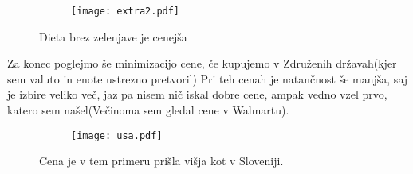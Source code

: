 \documentclass{article}
\begin{document}
\begin{figure}[H]
\centering
\begin{subfigure}{.5\textwidth}
\texttt{[image: extra2.pdf]}
\end{subfigure}
\caption*{Dieta brez zelenjave je cenejša}
\end{figure}
\newpage
Za konec poglejmo še minimizacijo cene, če kupujemo v Združenih državah(kjer sem valuto in enote ustrezno pretvoril) Pri teh cenah je natančnost še manjša, saj je izbire veliko več, jaz pa nisem nič iskal dobre cene, ampak vedno vzel prvo, katero sem našel(Večinoma sem gledal cene v Walmartu).
\begin{figure}[H]
\centering
\begin{subfigure}{.5\textwidth}
\texttt{[image: usa.pdf]}
\end{subfigure}
\caption*{Cena je v tem primeru prišla višja kot v Sloveniji. }
\end{figure}
\end{document}
